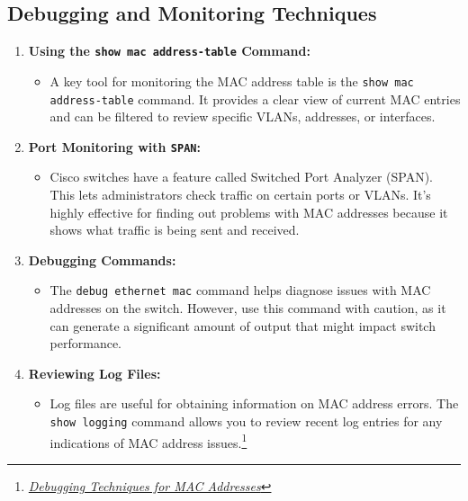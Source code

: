 \documentclass[11pt,a4paper]{article}
\begin{document}
\subsection*{Debugging and Monitoring Techniques}
\begin{enumerate}
        \item \textbf{Using the \lstinline{show mac address-table} Command:}
    \begin{itemize}
        \item A key tool for monitoring the MAC address table is the \lstinline{show mac address-table} command. It provides a clear view of current MAC entries and can be filtered to review specific VLANs, addresses, or interfaces.
    \end{itemize}

    \item \textbf{Port Monitoring with \lstinline{SPAN}:}
        \begin{itemize}
            \item Cisco switches have a feature called Switched Port Analyzer (SPAN). This lets administrators check traffic on certain ports or VLANs. It’s highly effective for finding out problems with MAC addresses because it shows what traffic is being sent and received.
        \end{itemize}

    \item \textbf{Debugging Commands:}
        \begin{itemize}
            \item The \lstinline{debug ethernet mac} command helps diagnose issues with MAC addresses on the switch. However, use this command with caution, as it can generate a significant amount of output that might impact switch performance.
        \end{itemize}

    \item \textbf{Reviewing Log Files:}
        \begin{itemize}
            \item Log files are useful for obtaining information on MAC address errors. The \lstinline{show logging} command allows you to review recent log entries for any indications of MAC address issues.\footnote{\href{https://netseccloud.com/how-to-manage-and-troubleshoot-the-cisco-mac-address-table}{\textit{Debugging Techniques for MAC Addresses}}}
        \end{itemize}

\end{enumerate}
\end{document}
